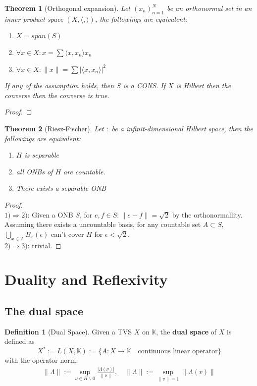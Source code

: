 \documentclass[a4paper,11pt,fleqn]{book}
\newtheorem{theorem}{Theorem}[section]
\theoremstyle{definition}
\newtheorem{definition}{Definition}[section]
\theoremstyle{remark}
\begin{document}
\begin{theorem}[Orthogonal expansion]
	Let $(x_n)_{n = 1}^N$ be an orthonormal set in an inner product space $(X, \langle, \rangle) $, the followings are equivalent:
	\begin{enumerate}
		\item $X = \overline{span(S)}$
		\item $\forall x \in X: x = \sum \langle x, x_n\rangle x_n$
		\item $\forall x \in X: \|x\| = \sum |\langle x, x_n\rangle|^2$ 
	\end{enumerate} 
	If any of the assumption holds, then $S$ is a CONS. If $X$ is Hilbert then the converse then the converse is true.	
\end{theorem}
\begin{proof}
\end{proof}

\begin{theorem}[Riesz-Fischer]
	Let $:$ be a infinit-dimensional Hilbert space, then the followings are equivalent:
	\begin{enumerate}
		\item $H$ is separable
		\item all ONBs of $H$ are countable.
		\item There exists a separable ONB
	\end{enumerate} 
\end{theorem}
\begin{proof}
	\quad\\
	$1)\Rightarrow 2)$: Given a ONB $S$, for $e, f \in S: \|e -f\| = \sqrt{2}$ by the orthonormallity. Assuming there exists a uncountable basis, for any countable set $A \subset S$, $\bigcup_{x \in A} B_x(\epsilon)$ can't cover $H$ for $\epsilon < \sqrt{2}$.  \\
	$2)\Rightarrow 3)$: trivial. 
\end{proof}




\newpage
\section{Duality and Reflexivity}
\subsection{The dual space}
\begin{definition}[Dual Space]
	Given a TVS $X$ on $\mathbb{K}$, the \textbf{dual space} of $X$ is defined as
	\begin{equation*}
		X^* := L(X, \mathbb{K}) := \{ A: X \rightarrow \mathbb{K} \quad \text{continuous linear operator}\}
	\end{equation*}
	with the operator norm:
	\begin{align*}
	\|\Lambda\|:= \sup_{\nu \in H \backslash 0} \frac{|\Lambda (\nu)|}{\|\nu\|}, \quad \|\Lambda\|:= \sup_{\|v\| = 1} \|\Lambda(v)\|
\end{align*}
\end{definition}
\end{document}

